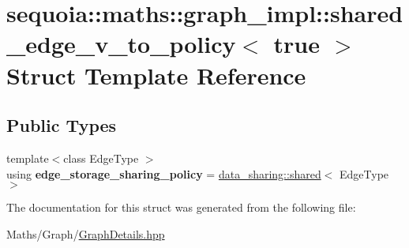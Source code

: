 \hypertarget{structsequoia_1_1maths_1_1graph__impl_1_1shared__edge__v__to__policy_3_01true_01_4}{}\section{sequoia\+::maths\+::graph\+\_\+impl\+::shared\+\_\+edge\+\_\+v\+\_\+to\+\_\+policy$<$ true $>$ Struct Template Reference}
\label{structsequoia_1_1maths_1_1graph__impl_1_1shared__edge__v__to__policy_3_01true_01_4}
\subsection*{Public Types}
\begin{DoxyCompactItemize}
\item 
\mbox{\label{structsequoia_1_1maths_1_1graph__impl_1_1shared__edge__v__to__policy_3_01true_01_4_a0f4c52ac5cb2a442359b89e4c2d807b3}} 
{\footnotesize template$<$class Edge\+Type $>$ }\\using {\bfseries edge\+\_\+storage\+\_\+sharing\+\_\+policy} = \mbox{\hyperlink{structsequoia_1_1data__sharing_1_1shared}{data\+\_\+sharing\+::shared}}$<$ Edge\+Type $>$
\end{DoxyCompactItemize}


The documentation for this struct was generated from the following file\+:\begin{DoxyCompactItemize}
\item 
Maths/\+Graph/\mbox{\hyperlink{_graph_details_8hpp}{Graph\+Details.\+hpp}}\end{DoxyCompactItemize}
